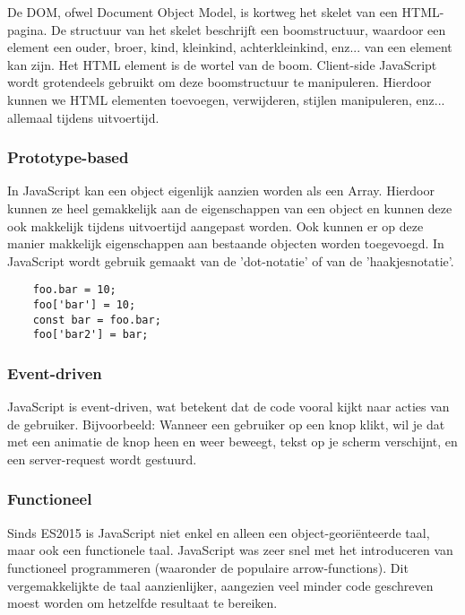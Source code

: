 De DOM, ofwel Document Object Model, is kortweg het skelet van een HTML-pagina. De structuur van het skelet beschrijft een boomstructuur, waardoor een element een ouder, broer, kind, kleinkind, achterkleinkind, enz... van een element kan zijn. Het HTML element is de wortel van de boom. Client-side JavaScript wordt grotendeels gebruikt om deze boomstructuur te manipuleren. Hierdoor kunnen we HTML elementen toevoegen, verwijderen, stijlen manipuleren, enz... allemaal tijdens uitvoertijd. \textcite{Kantor2017}

\subsubsection{Prototype-based}
\label{sec:prototypeBased}

In JavaScript kan een object eigenlijk aanzien worden als een Array. Hierdoor kunnen ze heel gemakkelijk aan de eigenschappen van een object en kunnen deze ook makkelijk tijdens uitvoertijd aangepast worden. Ook kunnen er op deze manier makkelijk eigenschappen aan bestaande objecten worden toegevoegd. In JavaScript wordt gebruik gemaakt van de 'dot-notatie' of van de 'haakjesnotatie'. 

	\begin{verbatim}
	foo.bar = 10;
	foo['bar'] = 10;
	const bar = foo.bar;
	foo['bar2'] = bar;
	\end{verbatim}

\subsubsection{Event-driven}
\label{sec:eventDriven}

JavaScript is event-driven, wat betekent dat de code vooral kijkt naar acties van de gebruiker. Bijvoorbeeld: Wanneer een gebruiker op een knop klikt, wil je dat met een animatie de knop heen en weer beweegt, tekst op je scherm verschijnt, en een server-request wordt gestuurd. 

\subsubsection{Functioneel}
\label{sec:functional}

Sinds ES2015 is JavaScript niet enkel en alleen een object-georiënteerde taal, maar ook een functionele taal. JavaScript was zeer snel met het introduceren van functioneel programmeren (waaronder de populaire arrow-functions). Dit vergemakkelijkte de taal aanzienlijker, aangezien veel minder code geschreven moest worden om hetzelfde resultaat te bereiken.

